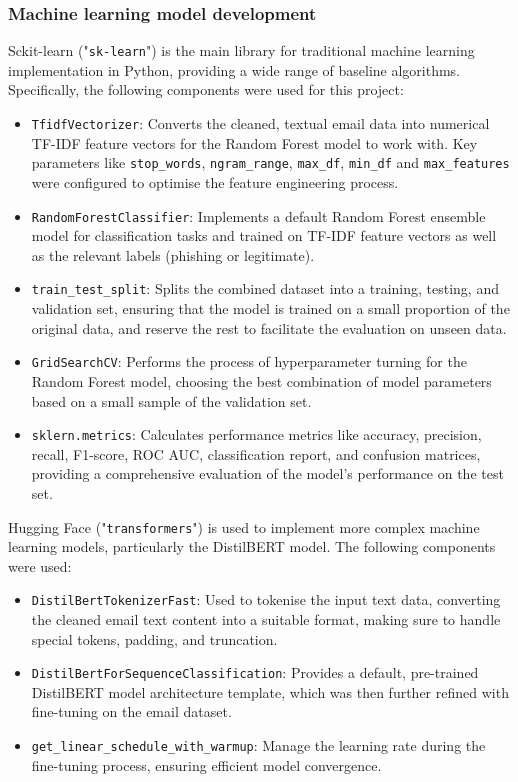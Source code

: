 
\subsubsection*{Machine learning model development}
Sckit-learn ("\texttt{sk-learn}") is the main library for traditional machine learning implementation in Python, providing a wide range of baseline algorithms. Specifically, the following components were used for this project:

\begin{itemize}
  \item \texttt{TfidfVectorizer}: Converts the cleaned, textual email data into numerical TF-IDF feature vectors for the Random Forest model to work with. Key parameters like \texttt{stop\_words}, \texttt{ngram\_range}, \texttt{max\_df}, \texttt{min\_df} and \texttt{max\_features} were configured to optimise the feature engineering process.
  \item \texttt{RandomForestClassifier}: Implements a default Random Forest ensemble model for classification tasks and trained on TF-IDF feature vectors as well as the relevant labels (phishing or legitimate).
  \item \texttt{train\_test\_split}: Splits the combined dataset into a training, testing, and validation set, ensuring that the model is trained on a small proportion of the original data, and reserve the rest to facilitate the evaluation on unseen data.
  \item \texttt{GridSearchCV}: Performs the process of hyperparameter turning for the Random Forest model, choosing the best combination of model parameters based on a small sample of the validation set.
  \item \texttt{sklern.metrics}: Calculates performance metrics like accuracy, precision, recall, F1-score, ROC AUC, classification report, and confusion matrices, providing a comprehensive evaluation of the model's performance on the test set.
\end{itemize}

\noindent Hugging Face ("\texttt{transformers}") is used to implement more complex machine learning models, particularly the DistilBERT model. The following components were used:

\begin{itemize}
  \item \texttt{DistilBertTokenizerFast}: Used to tokenise the input text data, converting the cleaned email text content into a suitable format, making sure to handle special tokens, padding, and truncation.
  \item \texttt{DistilBertForSequenceClassification}: Provides a default, pre-trained DistilBERT model architecture template, which was then further refined with fine-tuning on the email dataset.
  \item \texttt{get\_linear\_schedule\_with\_warmup}: Manage the learning rate during the fine-tuning process, ensuring efficient model convergence.
\end{itemize}

